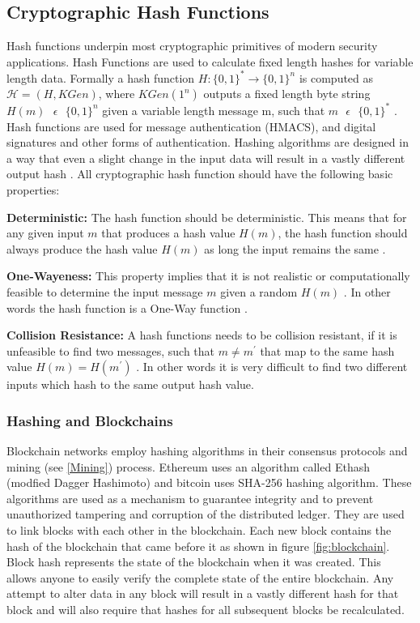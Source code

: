 \subsection{Cryptographic Hash Functions}
Hash functions underpin most cryptographic primitives of modern security applications. Hash Functions are used to calculate fixed length hashes for variable length data. Formally a hash function $H:\{0,1\}^* \rightarrow \{0,1\}^n$ is computed as $ \mathcal{H} = (H,KGen) $, where $ KGen(1^n) $ outputs a fixed length byte string $ H(m)  \text{ }\epsilon\text{ } \{0,1\}^n $ given a variable length message m, such that $m  \text{ }\epsilon\text{ } \{0,1\}^*$ \cite{cryptoeprint:2018:274}. Hash functions are used for message authentication (HMACS), and digital signatures and other forms of authentication. Hashing algorithms are designed in a way that even a slight change in the input data will result in a vastly different output hash \cite{10.1007/978-3-540-25937-4_24}. All cryptographic hash function should have the following basic properties:


\textbf{Deterministic:} The hash function should be deterministic. This means that for any given input $m$ that produces a hash value $H(m)$, the hash function should always produce the hash value $H(m)$ as long the input remains the same \cite{10.1007/978-3-540-25937-4_24}.

\textbf{One-Wayeness:} This property implies that it is not realistic or computationally feasible to determine the input message $m$ given a random $H(m)$ \cite{cryptoeprint:2018:274}. In other words the hash function is a One-Way function \cite{10.1007/978-3-540-25937-4_24}.

\textbf{Collision Resistance:} A hash functions needs to be collision resistant, if it is unfeasible to find two messages, such that $ m \neq m^\prime$ that map to the same hash value $H(m) = {H(m^\prime)}$ \cite{cryptoeprint:2018:274}. In other words it is very difficult to find two different inputs which hash to the same output hash value.
\vspace{0.5cm}
\subsubsection{Hashing and Blockchains}
Blockchain networks employ hashing algorithms in their consensus protocols and mining (see \ref{Mining}) process. Ethereum uses an algorithm called Ethash (modfied Dagger Hashimoto) and bitcoin uses SHA-256 \cite{dang_2015} hashing algorithm. These algorithms are used as a mechanism to guarantee integrity and to prevent unauthorized tampering and corruption of the distributed ledger. They are used to link blocks with each other in the blockchain. Each new block contains the hash of the blockchain that came before it as shown in figure \ref{fig:blockchain}. Block hash represents the state of the blockchain when it was created. This allows anyone to easily verify the complete state of the entire blockchain. Any attempt to alter data in any block will result in a vastly different hash for that block and will also require that hashes for all subsequent blocks be recalculated.
\vspace{0.5cm}
